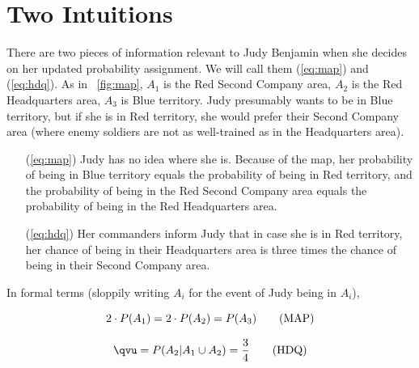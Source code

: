 \documentclass[phd,12pt,oneside]{ubcthesis}
\begin{document}
\section{Two Intuitions}
\label{sec:daingeum}

There are two pieces of information relevant to Judy Benjamin
when she decides on her updated probability assignment. We will call
them ({\ref{eq:map}}) and ({\ref{eq:hdq}}). As in
{\igure}~\ref{fig:map}, $A_{1}$ is the Red Second Company area, $A_{2}$ is
the Red Headquarters area, $A_{3}$ is Blue territory. Judy presumably
wants to be in Blue territory, but if she is in Red territory, she
would prefer their Second Company area (where enemy soldiers are not
as well-trained as in the Headquarters area).

\begin{enumerate}
\item[({\ref{eq:map}})] Judy has no idea where she is. Because of the
  map, her probability of being in Blue territory equals the
  probability of being in Red territory, and the probability of being
  in the Red Second Company area equals the probability of being in
  the Red Headquarters area.
\item[({\ref{eq:hdq}})] Her commanders inform Judy that in case she is in Red
  territory, her chance of being in their Headquarters area is three
  times the chance of being in their Second Company area.
\end{enumerate}

\nial In formal terms (sloppily writing $A_{i}$ for the event of Judy
being in $A_{i}$),

\begin{equation}
  \label{eq:map}
  2\cdot{}P(A_{1})=2\cdot{}P(A_{2})=P(A_{3})\tag{\mbox{MAP}}
\end{equation}

\begin{equation}
  \label{eq:hdq}
  {\qvu}=P(A_{2}|A_{1}\cup{}A_{2})=\frac{3}{4}\tag{\mbox{HDQ}}
\end{equation}
\end{document}
